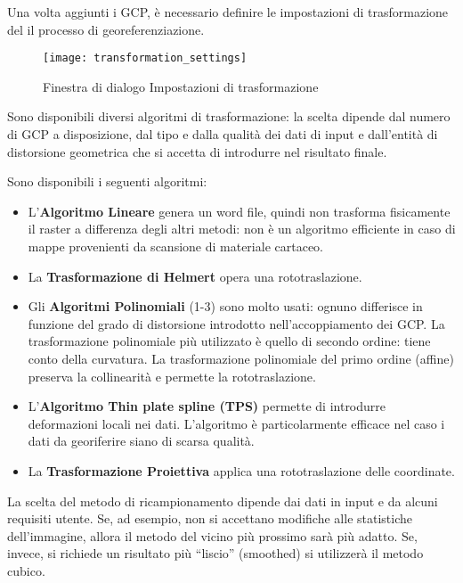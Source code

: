 Una volta aggiunti i GCP, è necessario definire le impostazioni di trasformazione del 
il processo di georeferenziazione. 

\begin{figure}[ht]
\centering
  \texttt{[image: transformation\_settings]}
  \caption{Finestra di dialogo Impostazioni di trasformazione \nixcaption}\label{fig:georef_transform}
\end{figure}


Sono disponibili diversi algoritmi di trasformazione: la scelta dipende dal 
numero di GCP a disposizione, dal tipo e dalla qualità dei dati di input e 
dall'entità di distorsione geometrica che si accetta di introdurre nel 
risultato finale.

Sono disponibili i seguenti algoritmi: 

\begin{itemize}[label=--]
\item L'\textbf{Algoritmo Lineare} genera un word file, quindi non trasforma fisicamente 
il raster a differenza degli altri metodi: non è un algoritmo efficiente in caso 
di mappe provenienti da scansione di materiale cartaceo.
\item La \textbf{Trasformazione di Helmert} opera una rototraslazione.
\item Gli \textbf{Algoritmi Polinomiali} (1-3) sono molto usati: ognuno differisce in funzione 
del grado di distorsione introdotto nell'accoppiamento dei GCP. La trasformazione polinomiale 
più utilizzato è quello di secondo ordine: tiene conto della curvatura. La trasformazione 
polinomiale del primo ordine (affine) preserva la collinearità e permette la rototraslazione.
\item L'\textbf{Algoritmo Thin plate spline (TPS)} permette di introdurre deformazioni locali 
nei dati. L'algoritmo è particolarmente efficace nel caso i dati da georiferire siano di scarsa qualità.
\item La \textbf{Trasformazione Proiettiva} applica una rototraslazione delle coordinate.
\end{itemize}


La scelta del metodo di ricampionamento dipende dai dati in input e da alcuni requisiti utente.
Se, ad esempio, non si accettano modifiche alle statistiche dell'immagine, allora il metodo 
del vicino più prossimo sarà più adatto. Se, invece, si richiede un risultato più ``liscio'' 
(smoothed) si utilizzerà il metodo cubico.

